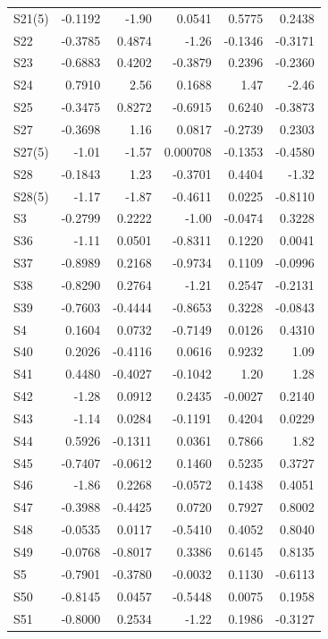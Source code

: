 \begin{longtable}{lrrrrr}
  S21(5) & -0.1192 & -1.90 & 0.0541 & 0.5775 & 0.2438 \\
  S22 & -0.3785 & 0.4874 & -1.26 & -0.1346 & -0.3171 \\
  S23 & -0.6883 & 0.4202 & -0.3879 & 0.2396 & -0.2360 \\
  S24 & 0.7910 & 2.56 & 0.1688 & 1.47 & -2.46 \\
  S25 & -0.3475 & 0.8272 & -0.6915 & 0.6240 & -0.3873 \\
  S27 & -0.3698 & 1.16 & 0.0817 & -0.2739 & 0.2303 \\
  S27(5) & -1.01 & -1.57 & 0.000708 & -0.1353 & -0.4580 \\
  S28 & -0.1843 & 1.23 & -0.3701 & 0.4404 & -1.32 \\
  S28(5) & -1.17 & -1.87 & -0.4611 & 0.0225 & -0.8110 \\
  S3 & -0.2799 & 0.2222 & -1.00 & -0.0474 & 0.3228 \\
  S36 & -1.11 & 0.0501 & -0.8311 & 0.1220 & 0.0041 \\
  S37 & -0.8989 & 0.2168 & -0.9734 & 0.1109 & -0.0996 \\
  S38 & -0.8290 & 0.2764 & -1.21 & 0.2547 & -0.2131 \\
  S39 & -0.7603 & -0.4444 & -0.8653 & 0.3228 & -0.0843 \\
  S4 & 0.1604 & 0.0732 & -0.7149 & 0.0126 & 0.4310 \\
  S40 & 0.2026 & -0.4116 & 0.0616 & 0.9232 & 1.09 \\
  S41 & 0.4480 & -0.4027 & -0.1042 & 1.20 & 1.28 \\
  S42 & -1.28 & 0.0912 & 0.2435 & -0.0027 & 0.2140 \\
  S43 & -1.14 & 0.0284 & -0.1191 & 0.4204 & 0.0229 \\
  S44 & 0.5926 & -0.1311 & 0.0361 & 0.7866 & 1.82 \\
  S45 & -0.7407 & -0.0612 & 0.1460 & 0.5235 & 0.3727 \\
  S46 & -1.86 & 0.2268 & -0.0572 & 0.1438 & 0.4051 \\
  S47 & -0.3988 & -0.4425 & 0.0720 & 0.7927 & 0.8002 \\
  S48 & -0.0535 & 0.0117 & -0.5410 & 0.4052 & 0.8040 \\
  S49 & -0.0768 & -0.8017 & 0.3386 & 0.6145 & 0.8135 \\
  S5 & -0.7901 & -0.3780 & -0.0032 & 0.1130 & -0.6113 \\
  S50 & -0.8145 & 0.0457 & -0.5448 & 0.0075 & 0.1958 \\
  S51 & -0.8000 & 0.2534 & -1.22 & 0.1986 & -0.3127 \\

\end{longtable}
